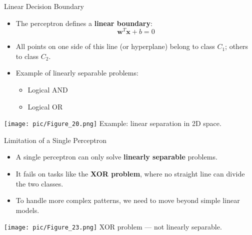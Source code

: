 \documentclass[serif, aspectratio=169]{beamer}
\begin{document}
    \begin{frame}{Linear Decision Boundary}
        \begin{itemize}\itemsep1em
        \item The perceptron defines a \textbf{linear boundary}:
        \[
            \mathbf{w}^T \mathbf{x} + b = 0
        \]
        \item All points on one side of this line (or hyperplane) belong to class \(C_1\); others to class \(C_2\).
        \item Example of linearly separable problems:
        \begin{itemize}
            \item Logical AND
            \item Logical OR
        \end{itemize}
        \end{itemize}
        \endminipage
        \hfill
        \centering
        \texttt{[image: pic/Figure\_20.png]}
        \scriptsize Example: linear separation in 2D space.
        \endminipage
    \end{frame}

    \begin{frame}{Limitation of a Single Perceptron}
        \begin{itemize}\itemsep1em
        \item A single perceptron can only solve \textbf{linearly separable} problems.
        \item It fails on tasks like the \textbf{XOR problem}, where no straight line can divide the two classes.
        \item To handle more complex patterns, we need to move beyond simple linear models.
        \end{itemize}
        \endminipage
        \hfill
        \centering
        \texttt{[image: pic/Figure\_23.png]}
        \scriptsize XOR problem — not linearly separable.
        \endminipage
    \end{frame}
\end{document}
